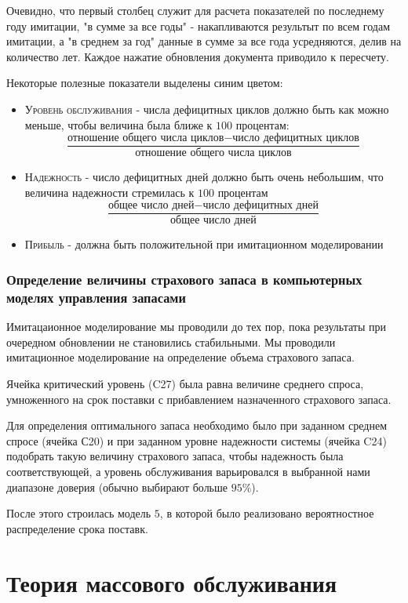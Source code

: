 \documentclass[aps,%
12pt,%
final,%
oneside,
onecolumn,%
musixtex, %
superscriptaddress,%
centertags]{article} %
\theoremstyle{plain}
\theoremstyle{definition}
\theoremstyle{remark}
\begin{document}
Очевидно, что первый столбец служит для расчета показателей по последнему году имитации, "в сумме за все годы" - накапливаются результыт по всем годам имитации, а "в среднем за год" данные в сумме за все года усредняются, делив на количество лет. Каждое нажатие обновления документа приводило к пересчету.

Некоторые полезные показатели выделены синим цветом:
\begin{itemize}
	\item \textsc{Уровень обслуживания} - числа дефицитных циклов должно быть как можно меньше, чтобы величина была ближе к $100$ процентам:
	$$\frac{\text{отношение общего числа циклов} - \text{число дефицитных циклов}}{\text{отношение общего числа циклов}}$$
	\item \textsc{Надежность} - число дефицитных дней должно быть очень небольшим, что величина надежности стремилась к $100$ процентам
	$$\frac{\text{общее число дней} - \text{число дефицитных дней}}{\text{общее число дней}}$$
	\item \textsc{Прибыль} - должна быть положительной при имитационном моделировании
\end{itemize}

\newpage
\subsubsection{Определение величины страхового запаса в компьютерных моделях управления запасами}

Имитацаионное моделирование мы проводили до тех пор, пока результаты при очередном обновлении не становились стабильными. Мы проводили имитационное моделирование на определение объема страхового запаса.

Ячейка критический уровень (\textsc{C27}) была равна величине среднего спроса, умноженного на срок поставки с прибавлением назначенного страхового запаса.

Для определения оптимального запаса необходимо было при заданном среднем спросе (ячейка \textsc{С20}) и при заданном уровне надежности системы (ячейка \textsc{C24}) подобрать такую величину страхового запаса, чтобы надежность была соответствующей, а уровень обслуживания варьировался в выбранной нами диапазоне доверия  (обычно выбирают больше $95\%$).

После этого строилась модель $5$, в которой было реализовано вероятностное распределение срока поставк.

\newpage
\section{Теория массового обслуживания}
\end{document}
